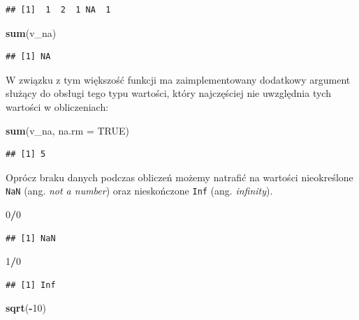\documentclass[]{book}
\newenvironment{Shaded}{\begin{snugshade}}{\end{snugshade}}
\newcommand{\KeywordTok}[1]{\textcolor[rgb]{0.13,0.29,0.53}{\textbf{#1}}}
\newcommand{\DataTypeTok}[1]{\textcolor[rgb]{0.13,0.29,0.53}{#1}}
\newcommand{\DecValTok}[1]{\textcolor[rgb]{0.00,0.00,0.81}{#1}}
\newcommand{\OtherTok}[1]{\textcolor[rgb]{0.56,0.35,0.01}{#1}}
\newcommand{\OperatorTok}[1]{\textcolor[rgb]{0.81,0.36,0.00}{\textbf{#1}}}
\newcommand{\NormalTok}[1]{#1}
\begin{document}
\begin{verbatim}
## [1]  1  2  1 NA  1
\end{verbatim}

\begin{Shaded}
\begin{Highlighting}[]
\KeywordTok{sum}\NormalTok{(v_na)}
\end{Highlighting}
\end{Shaded}

\begin{verbatim}
## [1] NA
\end{verbatim}

W związku z tym większość funkcji ma zaimplementowany dodatkowy argument
służący do obsługi tego typu wartości, który najczęściej nie uwzględnia
tych wartości w obliczeniach:

\begin{Shaded}
\begin{Highlighting}[]
\KeywordTok{sum}\NormalTok{(v_na, }\DataTypeTok{na.rm =} \OtherTok{TRUE}\NormalTok{)}
\end{Highlighting}
\end{Shaded}

\begin{verbatim}
## [1] 5
\end{verbatim}

Oprócz braku danych podczas obliczeń możemy natrafić na wartości
nieokreślone \texttt{NaN} (ang. \emph{not a number}) oraz nieskończone
\texttt{Inf} (ang. \emph{infinity}).

\begin{Shaded}
\begin{Highlighting}[]
\DecValTok{0}\OperatorTok{/}\DecValTok{0}
\end{Highlighting}
\end{Shaded}

\begin{verbatim}
## [1] NaN
\end{verbatim}

\begin{Shaded}
\begin{Highlighting}[]
\DecValTok{1}\OperatorTok{/}\DecValTok{0}
\end{Highlighting}
\end{Shaded}

\begin{verbatim}
## [1] Inf
\end{verbatim}

\begin{Shaded}
\begin{Highlighting}[]
\KeywordTok{sqrt}\NormalTok{(}\OperatorTok{-}\DecValTok{10}\NormalTok{)}
\end{Highlighting}
\end{Shaded}
\end{document}
